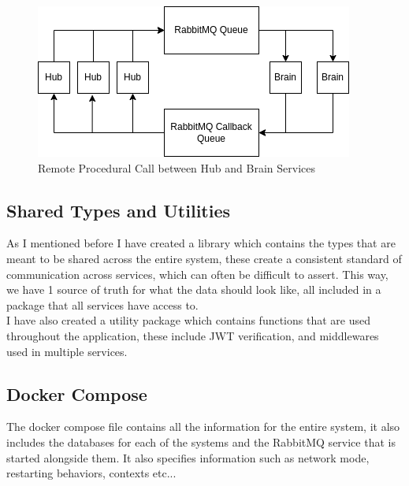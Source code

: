 \documentclass[titlepage]{article}
\begin{document}
\begin{figure}
\includegraphics[width=\textwidth]{RPC.png}
\caption{Remote Procedural Call between Hub and Brain Services}
\centering
\end{figure}
\pagebreak

\subsection{Shared Types and Utilities}
As I mentioned before I have created a library which contains the types that are meant to be shared across the entire system, these create a consistent standard of communication across services, which can often be difficult to assert. This way, we have 1 source of truth for what the data should look like, all included in a package that all services have access to. \\

I have also created a utility package which contains functions that are used throughout the application, these include JWT verification, and middlewares used in multiple services. 

\pagebreak

\subsection{Docker Compose}
The docker compose file contains all the information for the entire system, it also includes the databases for each of the systems and the RabbitMQ service that is started alongside them. It also specifies information such as network mode, restarting behaviors, contexts etc...
\end{document}
